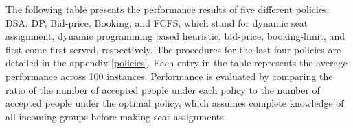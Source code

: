 


The following table presents the performance results of five different policies: DSA, DP, Bid-price, Booking, and FCFS, which stand for dynamic seat assignment, dynamic programming based heuristic, bid-price, booking-limit, and first come first served, respectively. The procedures for the last four policies are detailed in the appendix \ref{policies}. Each entry in the table represents the average performance across 100 instances. Performance is evaluated by comparing the ratio of the number of accepted people under each policy to the number of accepted people under the optimal policy, which assumes complete knowledge of all incoming groups before making seat assignments.

